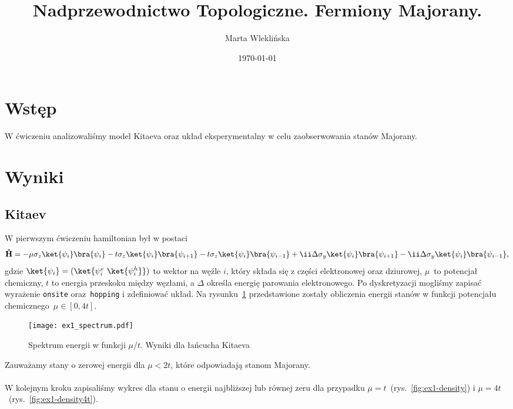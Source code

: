 \documentclass{article}
\title{Nadprzewodnictwo Topologiczne. Fermiony Majorany.}
\author{Marta Wleklińska}
\date{\today}
\newcommand{\opr}[1]{\mathbf{\hat{#1}}}
\begin{document}
\maketitle
\section{Wstęp}
W ćwiczeniu analizowaliśmy model Kitaeva oraz układ eksperymentalny w celu zaobserwowania stanów Majorany.
\section{Wyniki}
\subsection{Kitaev}
W pierwszym ćwiczeniu hamiltonian był w postaci
\begin{equation}
    \opr{H} = -\mu \sigma_z \ket{\psi_i}\bra{\psi_i} - t\sigma_z\ket{\psi_i}\bra{\psi_{i+1}}
    -
    t\sigma_z\ket{\psi_i}\bra{\psi_{i-1}}
    +\ii \Delta \sigma_y\ket{\psi_i}\bra{\psi_{i+1}}
    -\ii \Delta \sigma_y\ket{\psi_i}\bra{\psi_{i-1}},
\end{equation}
gdzie $\ket{\psi_i}=(\ket{\psi_i^e \ \ket{\psi_i^h}})$ to wektor na węźle $i$, który składa się z części elektronowej oraz dziurowej, $\mu$~to potencjał chemiczny, $t$ to energia przeskoku między węzłami, a $\Delta$ określa energię parowania elektronowego. 
Po dyskretyzacji mogliśmy zapisać wyrażenie \texttt{onsite} oraz~\texttt{hopping} i zdefiniować układ.
Na rysunku~\ref{fig:kitaev-spectra} przedstawione zostały obliczenia energii stanów w funkcji potencjału chemicznego~$\mu\in[0,4t]$.
\begin{figure}[htp!]
    \centering
    \texttt{[image: ex1\_spectrum.pdf]}
    \caption{Spektrum energii w funkcji $\mu/t.$ Wyniki dla łańcucha Kitaeva}
    \label{fig:kitaev-spectra}
\end{figure}
Zauważamy stany o zerowej energii dla $\mu<2t$, które odpowiadają stanom Majorany.\\
\\
W kolejnym kroku zapisaliśmy wykres dla stanu o energii najbliższej lub równej zeru dla przypadku $\mu=t$~(rys.~\ref{fig:ex1-density}) i $\mu=4t$~(rys.~\ref{fig:ex1-density4t}).
\end{document}
